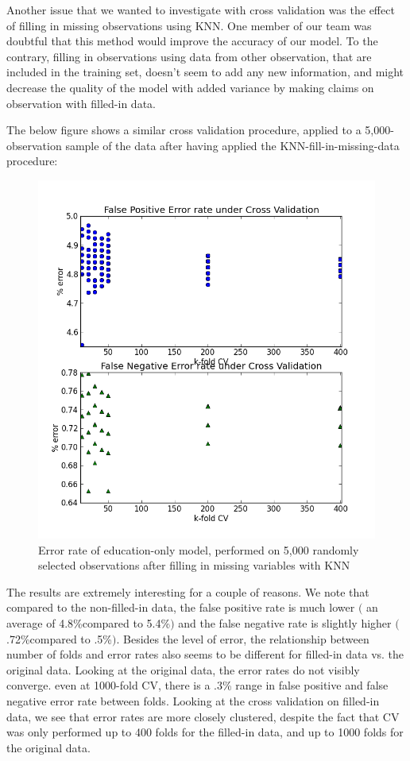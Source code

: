 \documentclass[11pt]{article}
\begin{document}
Another issue that we wanted to investigate with cross validation was the effect of filling in missing observations using KNN. 
One member of our team was doubtful that this method would improve the accuracy of our model. To the contrary, filling in observations using data from other observation, that are included in the training set, doesn't seem to add any new information, and might decrease the quality of the model with added variance by making claims on observation with filled-in data. 

The below figure shows a similar cross validation procedure, applied to a 5,000-observation sample of the data after having applied the KNN-fill-in-missing-data procedure:
\begin{figure}[H]
\centering
\includegraphics[width = 12cm]{CV_5K_400fold_filled.png}
\caption{Error rate of education-only model, performed on 5,000 randomly selected observations after filling in missing variables with KNN}
\end{figure}

The results are extremely interesting for a couple of reasons. We note that compared to the non-filled-in data, the false positive rate is much lower $($ an average of 4.8\%compared to 5.4\%$)$ and the false negative rate is slightly higher $($ .72\%compared to .5\%$)$.  Besides the level of error, the relationship between number of folds and error rates also seems to be different for filled-in data vs. the original data. Looking at the original data, the error rates do not visibly converge. even at 1000-fold CV, there is a .3\% range in false positive and false negative error rate between folds. Looking at the cross validation on filled-in data, we see that error rates are more closely clustered, despite the fact that CV was only performed up to 400 folds for the filled-in data, and up to 1000 folds for the original data. 
\end{document}

